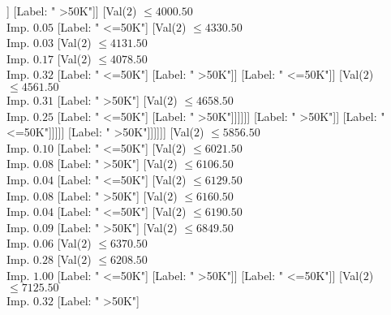 \documentclass[margin=10pt]{standalone}
\begin{document}
\begin{forest}
																								[Val($2$) $ \leq 3739.50$ \\ Imp. $0.42$
																									[Label: " >50K"]
																									[Label: " <=50K"]]
																								[Label: " >50K"]]
																							[Val($2$) $ \leq 4000.50$ \\ Imp. $0.05$
																								[Label: " <=50K"]
																								[Val($2$) $ \leq 4330.50$ \\ Imp. $0.03$
																									[Val($2$) $ \leq 4131.50$ \\ Imp. $0.17$
																										[Val($2$) $ \leq 4078.50$ \\ Imp. $0.32$
																											[Label: " <=50K"]
																											[Label: " >50K"]]
																										[Label: " <=50K"]]
																									[Val($2$) $ \leq 4561.50$ \\ Imp. $0.31$
																										[Label: " >50K"]
																										[Val($2$) $ \leq 4658.50$ \\ Imp. $0.25$
																											[Label: " <=50K"]
																											[Label: " >50K"]]]]]]
																						[Label: " >50K"]]
																					[Label: " <=50K"]]]]]
																	[Label: " >50K"]]]]]]
												[Val($2$) $ \leq 5856.50$ \\ Imp. $0.10$
													[Label: " <=50K"]
													[Val($2$) $ \leq 6021.50$ \\ Imp. $0.08$
														[Label: " >50K"]
														[Val($2$) $ \leq 6106.50$ \\ Imp. $0.04$
															[Label: " <=50K"]
															[Val($2$) $ \leq 6129.50$ \\ Imp. $0.08$
																[Label: " >50K"]
																[Val($2$) $ \leq 6160.50$ \\ Imp. $0.04$
																	[Label: " <=50K"]
																	[Val($2$) $ \leq 6190.50$ \\ Imp. $0.09$
																		[Label: " >50K"]
																		[Val($2$) $ \leq 6849.50$ \\ Imp. $0.06$
																			[Val($2$) $ \leq 6370.50$ \\ Imp. $0.28$
																				[Val($2$) $ \leq 6208.50$ \\ Imp. $1.00$
																					[Label: " <=50K"]
																					[Label: " >50K"]]
																				[Label: " <=50K"]]
																			[Val($2$) $ \leq 7125.50$ \\ Imp. $0.32$
																				[Label: " >50K"]

\end{forest}
\end{document}
